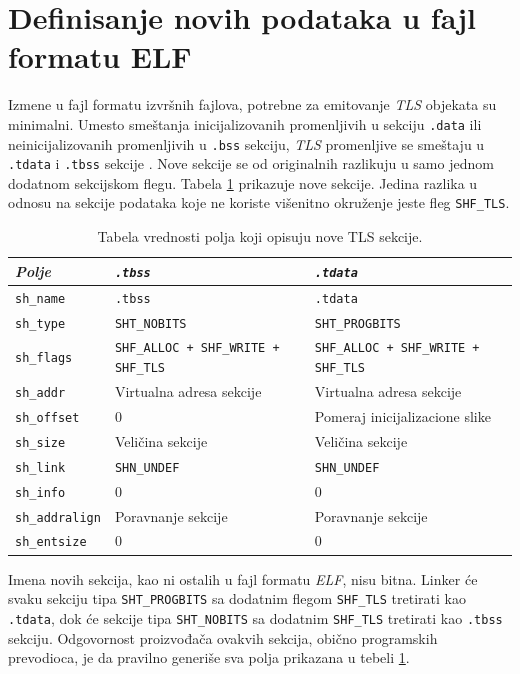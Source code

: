 \documentclass[12pt,oneside]{memoir}
\begin{document}
\section{Definisanje novih podataka u fajl formatu ELF}

Izmene u fajl formatu izvršnih fajlova, potrebne za emitovanje \emph{TLS} objekata su minimalni. Umesto smeštanja inicijalizovanih promenljivih u sekciju \texttt{.data} ili neinicijalizovanih promenljivih u \texttt{.bss} sekciju, \emph{TLS} promenljive se smeštaju u \texttt{.tdata} i \texttt{.tbss} sekcije \cite{TLS}. Nove sekcije se od originalnih razlikuju u samo jednom dodatnom sekcijskom flegu. Tabela \ref{tab:tls_secs} prikazuje nove sekcije. Jedina razlika u odnosu na sekcije podataka koje ne koriste višenitno okruženje jeste fleg \texttt{SHF\_TLS}.


\begin{table}
		\begin{center}
	\begin{tabular}{ | l | p{5cm} | p{5cm} |}
		\hline
		\emph{Polje} & \emph{\texttt{.tbss}} & \emph{\texttt{.tdata}} \\ \hline
		\texttt{sh\_name} & \texttt{.tbss} & \texttt{.tdata} \\ \hline
		\texttt{sh\_type} & \texttt{SHT\_NOBITS} & \texttt{SHT\_PROGBITS} \\ \hline
		\texttt{sh\_flags} & \texttt{SHF\_ALLOC + SHF\_WRITE + SHF\_TLS} & \texttt{SHF\_ALLOC + SHF\_WRITE + SHF\_TLS} \\ \hline
		\texttt{sh\_addr} & Virtualna adresa sekcije & Virtualna adresa sekcije \\ \hline
		\texttt{sh\_offset} & 0 & Pomeraj inicijalizacione slike \\ \hline
		\texttt{sh\_size} & Veličina sekcije & Veličina sekcije \\ \hline
		\texttt{sh\_link} & \texttt{SHN\_UNDEF} & \texttt{SHN\_UNDEF} \\ \hline
		\texttt{sh\_info} & 0 & 0 \\ \hline
		\texttt{sh\_addralign} & Poravnanje sekcije & Poravnanje sekcije \\ \hline
		\texttt{sh\_entsize} & 0 & 0 \\ \hline
	\end{tabular}
	\end{center}
	\caption{\label{tab:tls_secs}Tabela vrednosti polja koji opisuju nove TLS sekcije.}
\end{table}

Imena novih sekcija, kao ni ostalih u fajl formatu \emph{ELF}, nisu bitna. Linker će svaku sekciju tipa \texttt{SHT\_PROGBITS} sa dodatnim flegom \texttt{SHF\_TLS} tretirati kao \texttt{.tdata}, dok će sekcije tipa \texttt{SHT\_NOBITS} sa dodatnim \texttt{SHF\_TLS} tretirati kao \texttt{.tbss} sekciju. Odgovornost proizvođača ovakvih sekcija, obično programskih prevodioca, je da pravilno generiše sva polja prikazana u tebeli \ref{tab:tls_secs}.
\end{document}
